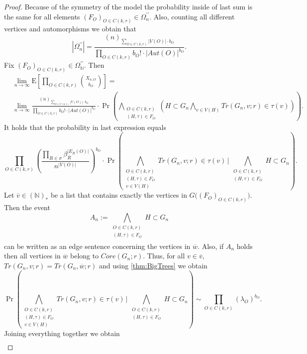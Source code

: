 \documentclass[12pt,notitlepage,a4paper]{article}
\theoremstyle{definition}
\newcommand{\N}{\mathbb{N}}
\newcommand{\Ln}{\lim\limits_{n\to \infty}}
\begin{document}
\begin{proof}
	Because of the symmetry of the model the probability inside of last sum 
	is the same for all elements $(F_O)_{O\in C(k,r)}\in \Omega_n^{\prime\prime}$.
	Also, counting all different vertices and automorphisms we obtain that
	\[
	|\Omega_n^{\prime\prime}|=
	\frac{(n)_{\sum_{O\in C(k,r)} |V(O)|\cdot b_O}}
	{\prod_{O\in C(k,r)} b_O!\cdot |Aut(O)|^{b_O}}.
	\]
	Fix $(F_O)_{O\in C(k,r)}\in \Omega_\N^{\prime\prime}$. Then 
	\begin{align*}
	&\Ln \mathrm{E}\left[
	\prod_{O\in C(k,r)}
	\binom{X_{n,O}}{b_O}
	\right]=\\
	&
	\Ln
	\frac{(n)_{\sum_{O\in C(k,r)} |V(O)|\cdot b_O}}
	{\prod_{O\in C(k,r)} b_O!\cdot |Aut(O)|^{b_O}} \cdot
	\Pr\left(
	\bigwedge_{
		\substack{
			O\in C(k,r)\\
			(H,\tau)\in F_O
	}}
	\left(
	H\subset G_n
	\bigwedge_{v\in V(H)}
	Tr(G_n,v;r)\in \tau(v)
	\right)
	\right).
	\end{align*}
	It holds that the probability in last expression equals
	\[
	\prod_{O\in C(k,r)}
	\left( 
	\frac{\prod_{R\in \sigma} \beta_R^{|E_R(O)|}}{n^{|V(O)|}}
	\right)^{b_O} \cdot
	\Pr\left(
	\bigwedge_{
		\substack{
			O\in C(k,r)\\
			(H,\tau)\in F_O\\
			v\in V(H)
	}}
	Tr(G_n,v;r)\in \tau(v) \,
	\Bigg|  \,
	\bigwedge_{
		\substack{
			O\in C(k,r)\\
			(H,\tau)\in F_O\\
		}}
	H\subset G_n
	\right).
	\]
	Let $\overline{v}\in (\N)_*$ be 
	a list that contains exactly the vertices in $G\big(
	(F_O)_{O\in C(k,r)}	\big)$. Then the event
	\[
	A_n:=
		\bigwedge_{
		\substack{
			O\in C(k,r)\\
			(H,\tau)\in F_O\\
	}}
	H\subset G_n
	\]
	can be written as an edge sentence concerning the vertices in $\overline{w}$.
	Also, if $A_n$ holds then all vertices in $\overline{w}$ belong to 
	$Core(G_n;r)$. Thus, for all $v\in \overline{v}$,
	$Tr(G_n,v;r)=Tr(G_n,\overline{w};r)$ and using \cref{thm:BigTrees}
	we obtain
	\[
	\Pr\left(
	\bigwedge_{
		\substack{
			O\in C(k,r)\\
			(H,\tau)\in F_O\\
			v\in V(H)
	}}
	Tr(G_n,v;r)\in \tau(v) \,
	\Bigg|  \,
	\bigwedge_{
		\substack{
			O\in C(k,r)\\
			(H,\tau)\in F_O\\
	}}
	H\subset G_n
	\right) \sim
	\prod_{O\in C(k,r)} (\lambda_O)^{b_O}.	
	\]
	Joining everything together we obtain
	\begin{align*}

\end{align*}
\end{proof}
\end{document}

